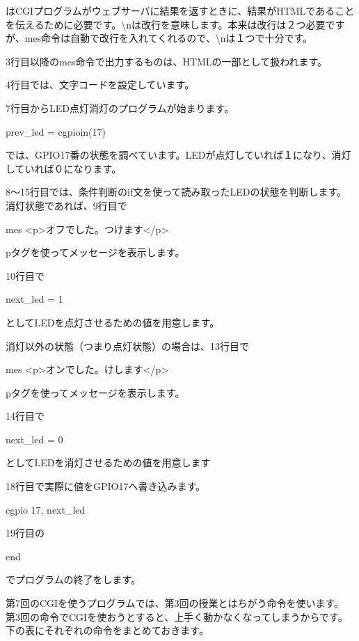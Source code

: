 \documentclass[a4paper,12pt,dvipdfmx]{jarticle}
\begin{document}
はCGIプログラムがウェブサーバに結果を返すときに、結果がHTMLであることを伝えるために必要です。{\textbackslash}nは改行を意味します。本来は改行は２つ必要ですが、mes命令は自動で改行を入れてくれるので、{\textbackslash}nは１つで十分です。


\bigskip

3行目以降のmes命令で出力するものは、HTMLの一部として扱われます。

4行目では、文字コードを設定しています。

7行目からLED点灯消灯のプログラムが始まります。

prev\_led = cgpioin(17)

では、GPIO17番の状態を調べています。LEDが点灯していれば１になり、消灯していれば０になります。


\bigskip


8〜15行目では、条件判断のif文を使って読み取ったLEDの状態を判断します。消灯状態であれば、9行目で

mes
	{\textquotedbl}{\textless}p{\textgreater}オフでした。つけます{\textless}/p{\textgreater}{\textquotedbl}

pタグを使ってメッセージを表示します。

10行目で

next\_led = 1

としてLEDを点灯させるための値を用意します。

消灯以外の状態（つまり点灯状態）の場合は、13行目で

mes
	{\textquotedbl}{\textless}p{\textgreater}オンでした。けします{\textless}/p{\textgreater}{\textquotedbl}

pタグを使ってメッセージを表示します。

14行目で

next\_led = 0

としてLEDを消灯させるための値を用意します

18行目で実際に値をGPIO17へ書き込みます。

cgpio 17, next\_led




\bigskip

19行目の

end

でプログラムの終了をします。


\bigskip


第7回のCGIを使うプログラムでは、第3回の授業とはちがう命令を使います。\\
第3回の命令でCGIを使おうとすると、上手く動かなくなってしまうからです。\\
下の表にそれぞれの命令をまとめておきます。\\
\end{document}
